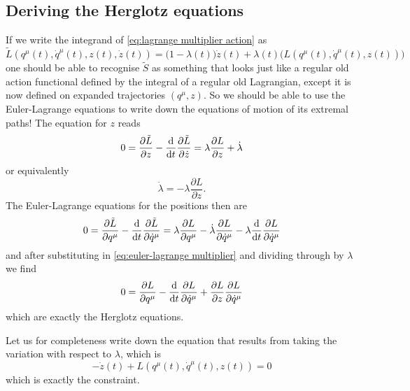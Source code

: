 \documentclass[../main.tex]{subfiles}
\begin{document}
\subsection{Deriving the Herglotz equations}
If we write the integrand of \cref{eq:lagrange multiplier action} as
\begin{equation*}
	\tilde{L}(q^\mu(t), \dot{q}^\mu(t), z(t), \dot{z}(t)) = \big(1 - \lambda(t)\big) \dot{z}(t) +
	\lambda(t)\big(L(q^\mu(t), \dot{q}^\mu(t), z(t))\big)
\end{equation*}
one should be able to recognise \( \tilde{S} \) as something that looks just like a
regular old action functional defined by the integral of a regular old Lagrangian, except
it is now defined on expanded trajectories \( (q^\mu, z) \). So we should be able to use
the Euler-Lagrange equations to write down the equations of motion of its extremal paths!
The equation for \( z \) reads
\begin{equation*}
	0 = \frac{\partial \tilde{L}}{\partial z} - \frac{\mathrm{d}}{\mathrm{d} t} \frac{\partial
	\tilde{L}}{\partial \dot{z}} = \lambda \frac{\partial L}{\partial z} + \dot{\lambda}
\end{equation*}
or equivalently
\begin{equation} \label{eq:euler-lagrange multiplier}
	\dot{\lambda} = -\lambda \frac{\partial L}{\partial z}. 
\end{equation}
The Euler-Lagrange equations for the positions then are
\begin{equation*}
	0 = \frac{\partial \tilde{L}}{\partial q^\mu} - \frac{\mathrm{d}}{\mathrm{d} t} \frac{\partial
	\tilde{L}}{\partial \dot{q}^\mu} = \lambda \frac{\partial L}{\partial q^\mu} -
	\dot{\lambda}\frac{\partial L}{\partial \dot{q}^\mu} - \lambda \frac{\mathrm{d}}{\mathrm{d}
	t}\frac{\partial L}{\partial \dot{q}^\mu}
\end{equation*}
and after substituting in \cref{eq:euler-lagrange multiplier} and dividing through by \(
\lambda \) we find
\begin{equation} \label{eq:euler-lagrange positions}
	0 = \frac{\partial L}{\partial q^\mu} - \frac{\mathrm{d}}{\mathrm{d} t} \frac{\partial L}{\partial
	\dot{q}^\mu} + \frac{\partial L}{\partial z}\frac{\partial L}{\partial \dot{q}^\mu}
\end{equation}
which are exactly the Herglotz equations. 

Let us for completeness write down the equation that results from taking the variation
with respect to \( \lambda \), which is
\begin{equation*}
	-\dot{z}(t) + L\left(q^\mu(t), \dot{q}^\mu(t), z(t)\right) = 0
\end{equation*}
which is exactly the constraint. 
\end{document}
